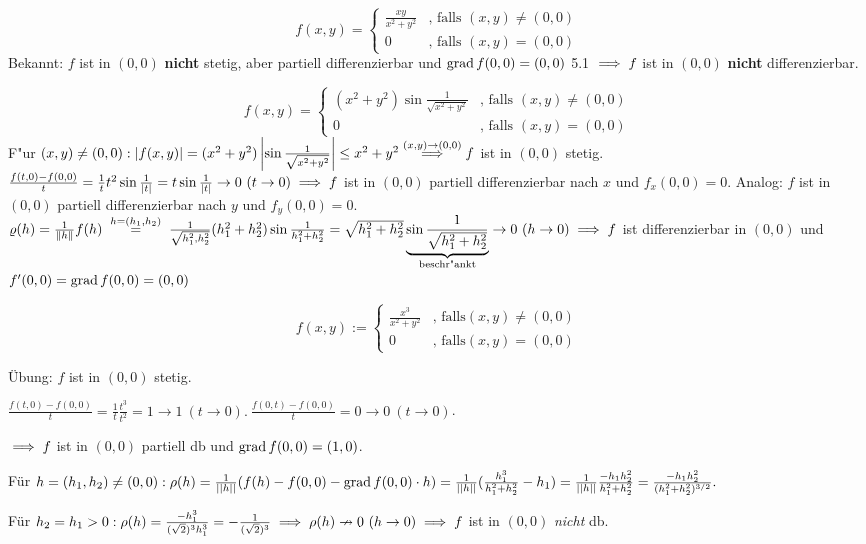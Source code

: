 \documentclass[a4paper,twoside,DIV15,BCOR12mm]{scrbook}
\begin{document}
\begin{beispiele}
\item $$f(x,y)=\begin{cases}
\frac{xy}{x^2+y^2}&\text{, falls } (x,y)\ne(0,0)\\
0&\text{, falls } (x,y)=(0,0)
\end{cases}$$
Bekannt: $f$ ist in $(0,0)$ \textbf{nicht} stetig, aber partiell differenzierbar und $\mathop{\rm grad}\nolimits f(0,0)=(0,0)$ 5.1 $\implies f$ ist in $(0,0)$ \textbf{nicht} differenzierbar.
\item $$f(x,y)=\begin{cases}
(x^2+y^2)\sin\frac{1}{\sqrt{x^2+y^2}}&\text{, falls } (x,y)\ne(0,0)\\
0&\text{, falls }(x,y)=(0,0)
\end{cases}$$
F"ur $(x,y)\ne(0,0): \left|f(x,y)\right|=(x^2+y^2)\left|\sin\frac{1}{\sqrt{x^2+y^2}}\right|\le x^2+y^2\overset{(x,y)\to(0,0)}{\implies}f$ ist in $(0,0)$ stetig. $\frac{f(t,0)-f(0,0)}{t}=\frac{1}{t}t^2\sin\frac{1}{|t|}=t\sin\frac{1}{|t|}\to 0\ (t\to 0)\implies f$ ist in $(0,0)$ partiell differenzierbar nach $x$ und $f_x(0,0)=0$. Analog: $f$ ist in $(0,0)$ partiell differenzierbar nach $y$ und $f_y(0,0)=0$. $\varrho(h)=\frac{1}{\|h\|}f(h)\gleichwegen{h=(h_1,h_2)}\frac{1}{\sqrt{h_1^2, h_2^2}}(h_1^2+h_2^2)\sin\frac{1}{h_1^2+h_2^2}=\sqrt{h_1^2+h_2^2}\underbrace{\sin\frac{1}{\sqrt{h_1^2+h_2^2}}}_{\text{beschr"ankt}}\to 0\ (h\to 0)\folgt f$ ist differenzierbar in $(0,0)$ und $f'(0,0)=\mathop{\rm grad}\nolimits f(0,0)=(0,0)$

\item $$f(x,y) := \begin{cases}
\frac{x^3}{x^2+y^2}&\text{, falls} (x,y) \ne (0,0)\\
0&\text{, falls} (x,y) = (0,0)\end{cases}$$

\"Ubung: $f$ ist in $(0,0)$ stetig.

$\frac{f(t,0) - f(0,0)}{t} = \frac{1}{t} \frac{t^3}{t^2} = 1 \to 1\ (t \to 0).\ \frac{f(0,t) - f(0,0)}{t} = 0 \to 0\ (t \to 0)$.

$\implies f$ ist in $(0,0)$ partiell db und $\mathop{\rm grad}\nolimits f(0,0) = (1,0)$.

Für $h = (h_1,h_2) \ne (0,0): \rho(h) = \frac{1}{||h||}(f(h) - f(0,0) - \mathop{\rm grad}\nolimits f(0,0)\cdot h) = \frac{1}{||h||} (\frac{h_1^3}{h_1^2+h_2^2} - h_1) = \frac{1}{||h||} \frac{-h_1 h_2^2}{h_1^2 + h_2^2} =  \frac{-h_1 h_2^2}{(h_1^2 + h_2^2)^{3/2}}.$

Für $h_2 = h_1 > 0: \rho(h) = \frac{-h_1^3}{(\sqrt{2})^3 h_1^3} = - \frac{1}{(\sqrt{2})^3} \implies \rho(h) \nrightarrow 0\ (h \to 0) \implies f$ ist in $(0,0)$ \emph{nicht} db.
\end{beispiele}
\end{document}

